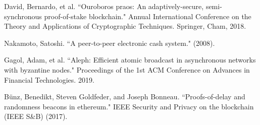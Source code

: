 \documentclass[11pt]{article}
\theoremstyle{definition}
\theoremstyle{remark}
\begin{document}
\begin{thebibliography}{100}
David, Bernardo, et al. ``Ouroboros praos: An adaptively-secure, semi-synchronous proof-of-stake blockchain." Annual International Conference on the Theory and Applications of Cryptographic Techniques. Springer, Cham, 2018.

Nakamoto, Satoshi. ``A peer-to-peer electronic cash system."  (2008).

Gagol, Adam, et al. ``Aleph: Efficient atomic broadcast in asynchronous networks with byzantine nodes." Proceedings of the 1st ACM Conference on Advances in Financial Technologies. 2019.

Bünz, Benedikt, Steven Goldfeder, and Joseph Bonneau. ``Proofs-of-delay and randomness beacons in ethereum." IEEE Security and Privacy on the blockchain (IEEE S\&B) (2017).
\end{thebibliography}
\end{document}
